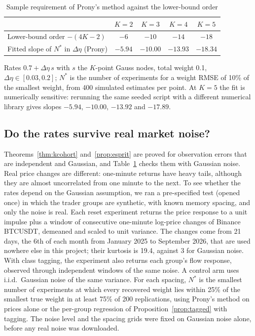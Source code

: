 \documentclass[12pt]{article}
\theoremstyle{definition}
\theoremstyle{remark}
\begin{document}
\begin{table}[t]\centering\small
\begin{threeparttable}
\caption{Sample requirement of Prony's method against the lower-bound order}\label{tab:kupper}
\begin{tabular}{lcccc}
\toprule
 & $K=2$ & $K=3$ & $K=4$ & $K=5$\\
\midrule
Lower-bound order $-(4K-2)$ & $-6$ & $-10$ & $-14$ & $-18$\\
Fitted slope of $N^*$ in $\Delta\eta$ (Prony) & $-5.94$ & $-10.00$ & $-13.93$ & $-18.34$\\
\bottomrule
\end{tabular}
\begin{tablenotes}\footnotesize\item Rates $0.7+\Delta\eta\,s$ with $s$ the $K$-point Gauss nodes, total weight 0.1, $\Delta\eta\in[0.03,0.2]$; $N^*$ is the number of experiments for a weight RMSE of 10\% of the smallest weight, from 400 simulated estimates per point. At $K=5$ the fit is numerically sensitive: rerunning the same seeded script with a different numerical library gives slopes $-5.94$, $-10.00$, $-13.92$ and $-17.89$. \end{tablenotes}
\end{threeparttable}
\end{table}

\subsection{Do the rates survive real market noise?}\label{sec:injection}

Theorems~\ref{thm:kcohort} and~\ref{prop:esprit} are proved for observation errors that are independent and Gaussian, and Table~\ref{tab:kupper} checks them with Gaussian noise. Real price changes are different: one-minute returns have heavy tails, although they are almost uncorrelated from one minute to the next. To see whether the rates depend on the Gaussian assumption, we ran a pre-specified test (opened once) in which the trader groups are synthetic, with known memory spacing, and only the noise is real. Each reset experiment returns the price response to a unit impulse plus a window of consecutive one-minute log-price changes of Binance BTCUSDT, demeaned and scaled to unit variance. The changes come from 21 days, the 6th of each month from January 2025 to September 2026, that are used nowhere else in this project; their kurtosis is 19.4, against 3 for Gaussian noise. With class tagging, the experiment also returns each group's flow response, observed through independent windows of the same noise. A control arm uses i.i.d.\ Gaussian noise of the same variance. For each spacing, $N^*$ is the smallest number of experiments at which every recovered weight lies within 25\% of the smallest true weight in at least 75\% of 200 replications, using Prony's method on prices alone or the per-group regression of Proposition~\ref{prop:tagged} with tagging. The noise level and the spacing grids were fixed on Gaussian noise alone, before any real noise was downloaded.
\end{document}
